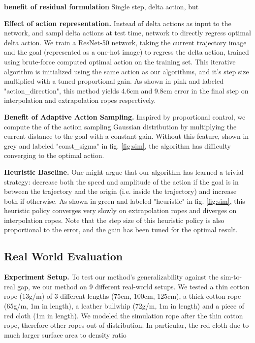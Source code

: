 \textbf{benefit of residual formulation }
Single step, delta action, but 

\textbf{Effect of action representation.}
Instead of  delta actions as input to the network, and sampl delta actions at test time,  network to directly regress  optimal delta action. We train a ResNet-50 network, taking the current trajectory image and the goal (represented as a one-hot image) to regress the delta action, trained using brute-force computed optimal action on the training set. This iterative algorithm is initialized using the same action as our algorithms, and it's step size multiplied with a tuned proportional gain. As shown in pink and labeled "action\_direction", this method yields 4.6cm and 9.8cm error in the final step on interpolation and extrapolation ropes respectively. 

\textbf{Benefit of Adaptive Action Sampling.}
Inspired by proportional control, we compute the  of the action sampling Gaussian distribution by multiplying the current distance to the goal with a constant gain. Without this feature, shown in grey and labeled "const\_sigma" in fig. \ref{fig:sim}, the algorithm has difficulty converging to the optimal action. 

\textbf{Heuristic Baseline.}
One might argue that our algorithm has learned a trivial strategy: decrease both the speed and amplitude of the action if the goal is in between the trajectory and the origin (i.e. inside the trajectory) and increase both if otherwise. As shown in green and labeled "heuristic" in fig. \ref{fig:sim}, this heuristic policy converges very slowly on extrapolation ropes and diverges on interpolation ropes. Note that the step size of this heuristic policy is also proportional to the error, and the gain has been tuned for the optimal result. 

\subsection{Real World Evaluation}
\textbf{Experiment Setup.}
To test our method's generalizability against the sim-to-real gap, we  our method on 9 different real-world setups. We tested a thin cotton rope (13g/m) of 3 different lengths (75cm, 100cm, 125cm), a thick cotton rope (65g/m, 1m in length), a leather bullwhip (72g/m, 1m in length) and a piece of red cloth (1m in length). We modeled the simulation rope after the thin cotton rope, therefore other ropes  out-of-distribution. In particular, the red cloth \ben{---} due to much larger surface area to density ratio 

